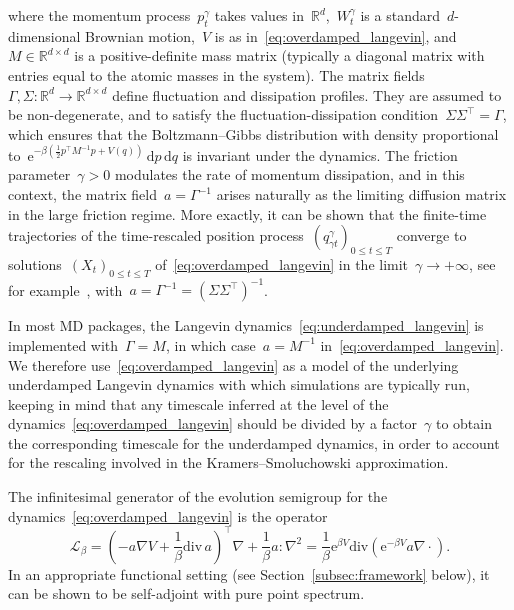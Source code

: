 \documentclass[a4]{article}
\newcommand{\cL}{\mathcal{L}}
\renewcommand{\d}{\mathrm{d}}
\newcommand{\e}{\mathrm{e}}
\renewcommand{\div}{\mathrm{div}}
\newcommand{\R}{\mathbb{R}}
\newcommand{\1}{\mathbbm 1}
\begin{document}
    where the momentum process~$p^\gamma_t$ takes values in~$\R^{d}$,~$W_t^\gamma$ is a standard~$d$-dimensional Brownian motion,~$V$ is as in~\eqref{eq:overdamped_langevin}, and~$M\in\R^{d\times d}$ is a positive-definite mass matrix (typically a diagonal matrix with entries equal to the atomic masses in the system).
    The matrix fields~$\Gamma,\Sigma:\R^d\to \R^{d\times d}$ define fluctuation and dissipation profiles. They are assumed to be non-degenerate, and to satisfy the fluctuation-dissipation condition~$ \Sigma \Sigma^\top  = \Gamma$, which ensures that the Boltzmann--Gibbs distribution with density proportional to~$\e^{-\beta(\frac12p^\top M^{-1}p + V(q))}\,\d p\,\d q$ is invariant under the dynamics.
    The friction parameter~$\gamma>0$ modulates the rate of momentum dissipation, and in this context, the matrix field~$a = \Gamma^{-1}$ arises naturally as the limiting diffusion matrix in the large friction regime.
    More exactly, it can be shown that the finite-time trajectories of the time-rescaled position process~$(q^\gamma_{\gamma t})_{0\leq t\leq T}$ converge to solutions~$(X_t)_{0\leq t \leq T}$ of~\eqref{eq:overdamped_langevin} in the limit~$\gamma\to +\infty$, see for example~\cite{B26}, with~$a=\Gamma^{-1}=\left(\Sigma\Sigma^\top\right)^{-1}$.

    In most MD packages, the Langevin dynamics~\eqref{eq:underdamped_langevin} is implemented with~$\Gamma = M$, in which case~$a=M^{-1}$ in~\eqref{eq:overdamped_langevin}. We therefore use~\eqref{eq:overdamped_langevin} as a model of the underlying underdamped Langevin dynamics with which simulations are typically run, keeping in mind that any timescale inferred at the level of the dynamics~\eqref{eq:overdamped_langevin} should be divided by a factor~$\gamma$ to obtain the corresponding timescale for the underdamped dynamics, in order to account for the rescaling involved in the Kramers--Smoluchowski approximation.

    The infinitesimal generator of the evolution semigroup for the dynamics~\eqref{eq:overdamped_langevin} is the operator
    \begin{equation}
        \label{eq:generator}
        \cL_\beta = \left(-a\nabla V + \frac1\beta\div\,a\right)^\top\nabla + \frac1\beta a:\nabla^2 = \frac1\beta\e^{\beta V}\div\left(\e^{-\beta V} a \nabla \cdot \right).
    \end{equation}
    In an appropriate functional setting (see Section~\ref{subsec:framework} below), it can be shown to be self-adjoint with pure point spectrum.
\end{document}
